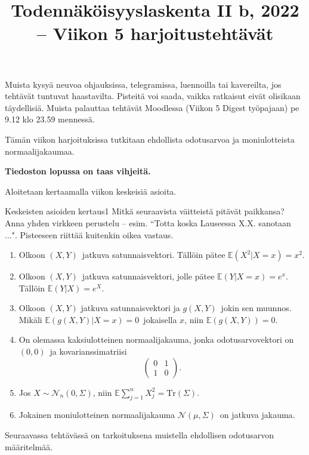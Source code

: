 \documentclass[11pt,a4paper]{amsart}
\title{Todennäköisyyslaskenta II b, 2022 -- Viikon 5 harjoitustehtävät}
\newcommand{\E}{\mathbb{E}}
\newcommand{\1}{\mathbf{1}}
\begin{document}
\maketitle

Muista kysyä neuvoa ohjauksissa, telegramissa, luennoilla tai kavereilta, jos tehtävät tuntuvat haastavilta. Pisteitä voi saada, vaikka ratkaisut eivät olisikaan täydellisiä.  Muista palauttaa tehtävät Moodlessa (Viikon 5 Digest työpajaan) pe 9.12 klo 23.59 mennessä.

\medskip 

Tämän viikon harjoituksissa tutkitaan ehdollista odotusarvoa ja moniulotteista normaalijakaumaa.

 {\bf Tiedoston lopussa on taas vihjeitä.}
\medskip 

Aloitetaan kertaamalla viikon keskeisiä asioita.
\begin{Exercises}{Keskeisten asioiden kertaus}{1}
Mitkä seuraavista väitteistä pitävät paikkansa? Anna yhden virkkeen perustelu -- esim. ``Totta koska Lauseessa X.X. sanotaan ...". Pisteeseen riittää kuitenkin oikea vastaus. 
\begin{enumerate}
\item Olkoon $(X,Y)$ jatkuva satunnaisvektori. Tällöin pätee $\E(X^2|X=x)=x^2$.
\item Olkoon $(X,Y)$ jatkuva satunnaisvektori, jolle pätee $\E(Y|X=x)=e^x$. Tällöin $\E(Y|X)=e^X$.
\item Olkoon $(X,Y)$ jatkuva satunnaisvektori ja $g(X,Y)$ jokin sen muunnos. Mikäli $\E(g(X,Y)|X=x)=0$ jokaisella $x$, niin $\E(g(X,Y))=0$.
\item On olemassa kaksiulotteinen normaalijakauma, jonka odotusarvovektori on $(0, 0)$ ja kovarianssimatriisi 
\[
\begin{pmatrix}
0 & 1\\
1 & 0
\end{pmatrix}.
\]
\item Jos $X\sim \mathcal N_n(0,\Sigma)$, niin $\E \sum_{j=1}^n X_j^2=\mathrm{Tr}(\Sigma)$. 
\item Jokainen moniulotteinen normaalijakauma $\mathcal N(\mu,\Sigma)$ on jatkuva jakauma.
\end{enumerate}
\end{Exercises}

Seuraavassa tehtävässä on tarkoituksena muistella ehdollisen odotusarvon määritelmää.
\end{document}
